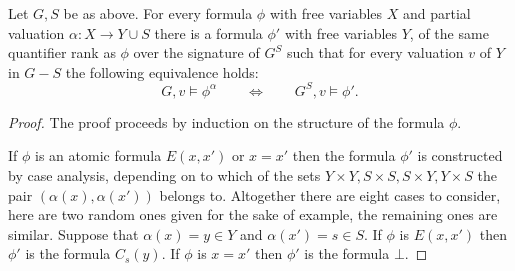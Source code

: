 \begin{lemma}\label{lem:remove-s}Let $G,S$ be as above.	
For every formula $\phi$ with free variables $X$ and partial valuation $\alpha:X\to Y\cup S$
there is a formula $\phi'$ with free variables $Y$,
of the same quantifier rank as $\phi$ over the signature of $G^S$ 
 such that for every valuation $v$ of $Y$ in $G-S$
the following equivalence holds:
$$G,v\models\phi^{\alpha}\qquad\iff\qquad G^S,v\models\phi'.$$
\end{lemma}
\begin{proof}
The proof proceeds by induction on the structure of the formula $\phi$. 

If $\phi$ is an atomic formula $E(x,x')$ or $x=x'$ then the formula $\phi'$ is constructed by case analysis, depending on to which of the sets  $Y\times Y,S\times S,S\times Y,Y\times S$ 
 the pair $(\alpha(x),\alpha(x'))$ belongs to. Altogether there are eight cases to consider, here are two random ones given for the sake of example, the remaining ones are similar.
 Suppose that $\alpha(x)=y\in Y$ and $\alpha(x')=s\in S$. If $\phi$ is $E(x,x')$ then $\phi'$ is the formula $C_{s}(y)$.
 If $\phi$ is $x=x'$ then $\phi'$ is the formula $\bot$.
 
 

%
%






\end{proof}
